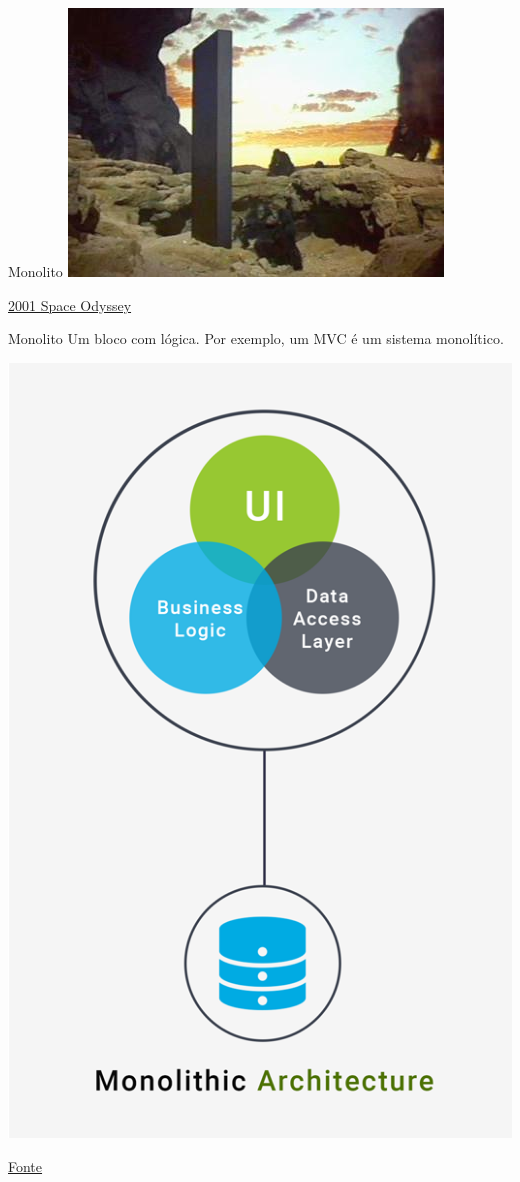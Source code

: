 \begin{frame}{Monolito}
\includegraphics[width=.6\textwidth]{images/monolith_2001}

\href{http://www.imdb.com/title/tt0062622/}{2001 Space Odyssey}
\end{frame}

\begin{frame}{Monolito}
Um bloco com lógica. Por exemplo, um MVC é um sistema monolítico.

\includegraphics[width=.4\textheight]{images/monolith_arc}

\href{http://nodexperts.com/blog/microservice-vs-monolithic/}{Fonte}
\end{frame}

